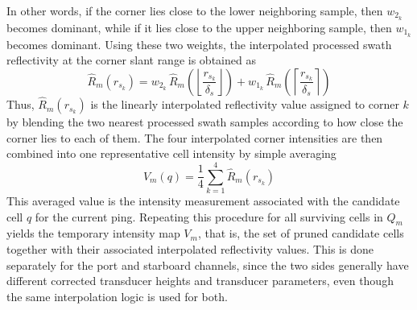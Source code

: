 In other words, if the corner lies close to the lower neighboring sample, then $w_{2_k}$ becomes dominant, while if it lies close to the upper neighboring sample, then $w_{1_k}$ becomes dominant. Using these two weights, the interpolated processed swath reflectivity at the corner slant range is obtained as
$$
    \hat{R}_m(r_{s_k})
    =
    w_{2_k}\,
    \hat{R}_m\!\left(
        \left\lfloor \frac{r_{s_k}}{\delta_s} \right\rfloor
    \right)
    +
    w_{1_k}\,
    \hat{R}_m\!\left(
        \left\lceil \frac{r_{s_k}}{\delta_s} \right\rceil
    \right)
$$
Thus, $\hat{R}_m(r_{s_k})$ is the linearly interpolated reflectivity value assigned to corner $k$ by blending the two nearest processed swath samples according to how close the corner lies to each of them. The four interpolated corner intensities are then combined into one representative cell intensity by simple averaging
\begin{equation}
    V_m(q) = \frac{1}{4}\sum_{k=1}^{4} \hat{R}_m(r_{s_k})
    \label{eq:local-map-generation-vm}
\end{equation}
This averaged value is the intensity measurement associated with the candidate cell $q$ for the current ping. Repeating this procedure for all surviving cells in $Q_m$ yields the temporary intensity map $V_m$, that is, the set of pruned candidate cells together with their associated interpolated reflectivity values. This is done separately for the port and starboard channels, since the two sides generally have different corrected transducer heights and transducer parameters, even though the same interpolation logic is used for both.



